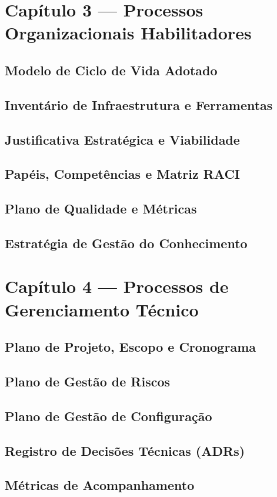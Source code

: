 \documentclass[12pt,a4paper]{article}
\begin{document}
\section{Capítulo 3 --- Processos Organizacionais Habilitadores}
\subsection{Modelo de Ciclo de Vida Adotado}
\subsection{Inventário de Infraestrutura e Ferramentas}
\subsection{Justificativa Estratégica e Viabilidade}
\subsection{Papéis, Competências e Matriz RACI}
\subsection{Plano de Qualidade e Métricas}
\subsection{Estratégia de Gestão do Conhecimento}

\section{Capítulo 4 --- Processos de Gerenciamento Técnico}
\subsection{Plano de Projeto, Escopo e Cronograma}
\subsection{Plano de Gestão de Riscos}
\subsection{Plano de Gestão de Configuração}
\subsection{Registro de Decisões Técnicas (ADRs)}
\subsection{Métricas de Acompanhamento}
\end{document}
